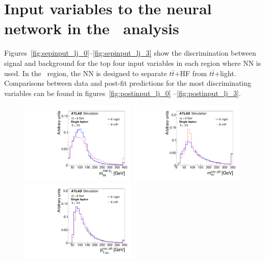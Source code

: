 \chapter{Input variables to the neural network in the \ttH\ analysis}
\label{app:separation}

Figures~\ref{fig:sepinput_lj_0}--\ref{fig:sepinput_lj_3}
show the discrimination between 
signal and background for the top four input variables in each region 
where NN is used.
In the \fivethree\ region, the NN is designed to separate $t\bar{t}$+HF from $t\bar{t}$+light.
Comparisons between data and post-fit predictions for the most discriminating variables can be found in figures~\ref{fig:postinput_lj_0} --\ref{fig:postinput_lj_3}.

\begin{figure}[tp]
\begin{center}
\includegraphics[width=0.49\textwidth]{Appendices/Figures_separation/mbb_maxPt_5_flav.pdf}
\includegraphics[width=0.49\textwidth]{Appendices/Figures_separation/WhadM_5_flav.pdf} \\
\includegraphics[width=0.49\textwidth]{Appendices/Figures_separation/WhadSpt_5_flav.pdf}

\end{center}
\end{figure}

